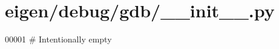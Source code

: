 \hypertarget{eigen_2debug_2gdb_2____init_____8py_source}{}\section{eigen/debug/gdb/\+\_\+\+\_\+init\+\_\+\+\_\+.py}
\label{eigen_2debug_2gdb_2____init_____8py_source}

\begin{DoxyCode}
00001 \textcolor{comment}{# Intentionally empty}
\end{DoxyCode}
